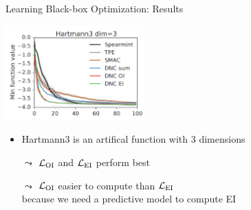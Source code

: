 \begin{frame}[c]{Learning Black-box Optimization: Results\newline {}}

\centering
\includegraphics[width=0.4\textwidth]{images/l2bo_hartmann3}

\begin{itemize}
\item Hartmann3 is an artifical function with 3 dimensions
\pause
\item[$\leadsto$] $\mathcal{L}_{\text{OI}}$ and $\mathcal{L}_{\text{EI}}$ perform best
\item[$\leadsto$] $\mathcal{L}_{\text{OI}}$ easier to compute than $\mathcal{L}_{\text{EI}}$\\ because we need a predictive model to compute EI 
\end{itemize}

\end{frame}



